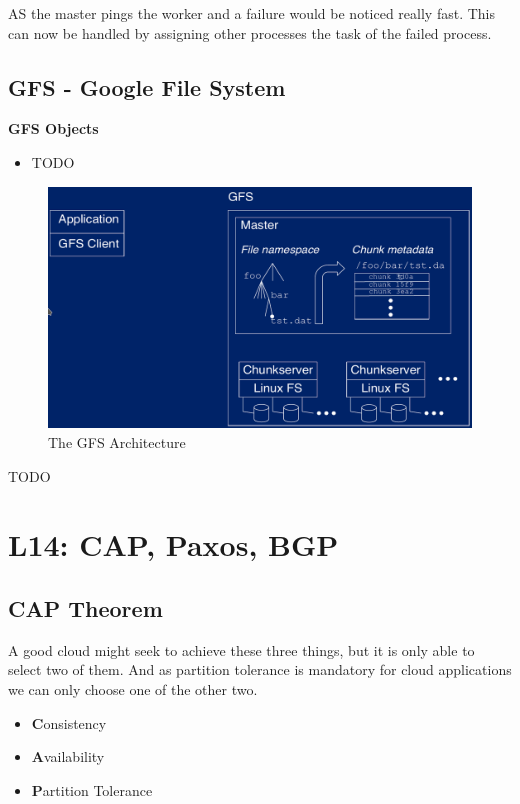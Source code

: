 \documentclass[a4paper]{article}
\begin{document}
\begin{multicols}{3}
AS the master pings the worker and a failure would be noticed really fast. This can now be handled by assigning other processes the task 
of the failed process.

\subsection*{GFS - Google File System}
\textbf{GFS Objects}
\begin{itemize}
    \item TODO 
\end{itemize}

\begin{figure}[H]
    \includegraphics[width=\linewidth]{GFSArchitecture.png}
    \caption{The GFS Architecture}
    \label{fig:gfs}
\end{figure}

TODO

\section*{L14: CAP, Paxos, BGP}

\subsection*{CAP Theorem}
A good cloud might seek to achieve these three things, but it is only able to select two of them.
And as partition tolerance is mandatory for cloud applications we can only choose one of the other two.

\begin{itemize}
    \item \textbf{C}onsistency
    \item \textbf{A}vailability
    \item \textbf{P}artition Tolerance
\end{itemize}


\end{multicols}
\end{document}

